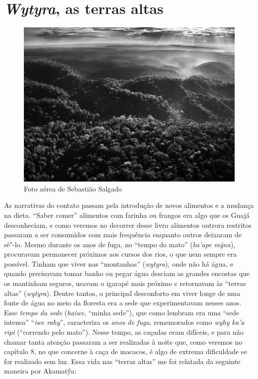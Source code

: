 \section{\emph{Wytyra}, as terras altas}

\begin{figure}[H]
\centering
  \includegraphics[width=\textwidth]{./imgs/Paisagem_SS}
\caption{Foto aérea de Sebastião Salgado}
\end{figure}

As narrativas do contato passam pela introdução de novos alimentos e a
mudança na dieta. ``Saber comer'' alimentos com farinha ou frangos era
algo que os Guajá desconheciam, e como veremos no decorrer desse livro
alimentos outrora restritos passaram a ser consumidos com mais
frequência enquanto outros deixaram de sê"-lo. Mesmo durante os anos de
fuga, no ``tempo do mato'' (\emph{ka'ape mỹna}), procuravam permanecer
próximos aos cursos dos rios, o que nem sempre era possível. Tinham que
viver nas ``montanhas'' (\emph{wytyra}), onde não há água, e quando
precisavam tomar banho ou pegar água desciam as grandes encostas que os
mantinham seguros, usavam o igarapé mais próximo e retornavam às
``terras altas'' (\emph{wytyra}). Dentre tantos, o principal desconforto
em viver longe de uma fonte de água no meio da floresta era a sede que
experimentavam nesses anos. Esse \emph{tempo da sede} (\emph{haiwe},
``minha sede''), que como lembram era uma ``sede intensa'' ``\emph{iwe
rahy}'', caracteriza os \emph{anos de fuga}, rememorados como \emph{wyhy
ka'a ripi} (``correndo pelo mato''). Nesse tempo, as caçadas eram
difíceis, e para não chamar tanta atenção passaram a ser realizadas à
noite que, como veremos no capítulo 8, no que concerne à caça de
macacos, é algo de extrema dificuldade se for realizado sem luz. Essa
vida nas ``terras altas'' me foi relatada da seguinte maneira por
Akamatỹa:

